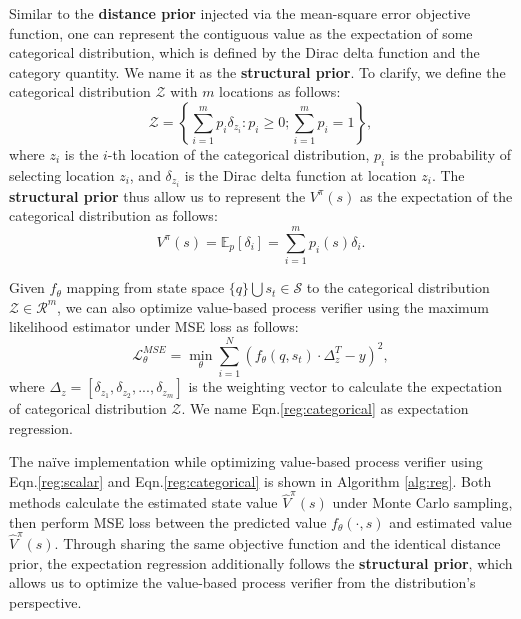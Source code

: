 Similar to the \textbf{distance prior} injected via the mean-square error objective function, one can represent the contiguous value as the expectation of some categorical distribution, which is defined by the Dirac delta function and the category quantity. We name it as the \textbf{structural prior}. To clarify, we define the categorical distribution $\mathcal{Z}$ with $m$ locations as follows:
\begin{equation}
    \mathcal{Z}=\left\{\sum_{i=1}^{m}p_i\delta_{z_i}:p_i\geq0;\sum_{i=1}^{m}p_i=1\right\},
\end{equation}
where $z_i$ is the $i$-th location of the categorical distribution,  $p_i$ is the probability of selecting location $z_i$, and $\delta_{z_i}$ is the Dirac delta function at location $z_i$. The \textbf{structural prior} thus allow us to represent the $V^\pi(s)$ as the expectation of the categorical distribution as follows:
\begin{equation}\label{value_cate}
    V^\pi(s)=\mathbb{E}_p[\delta_i]=\sum_{i=1}^{m}p_i(s)\delta_i.
\end{equation}

Given $f_\theta$ mapping from state space $\{q\}\bigcup s_t\in\mathcal{S}$ to the categorical distribution $\mathcal{Z}\in\mathcal{R}^{m}$, we can also optimize value-based process verifier using the maximum likelihood estimator under MSE loss as follows:
\begin{equation}\label{reg:categorical}
    \mathcal{L}_\theta^{MSE}=\min_\theta\sum_{i=1}^N(f_\theta(q,s_t)\cdot\Delta_z^T-y)^2,
\end{equation}
where $\Delta_z=[\delta_{z_1},\delta_{z_2},...,\delta_{z_{m}}]$ is the weighting vector to calculate the expectation of categorical distribution $\mathcal{Z}$. We name Eqn.\ref{reg:categorical} as expectation regression.


The na\"ive implementation while optimizing value-based process verifier using Eqn.\ref{reg:scalar} and Eqn.\ref{reg:categorical} is shown in Algorithm \ref{alg:reg}. Both methods calculate the estimated state value $\hat{V}^\pi(s)$ under Monte Carlo sampling, then perform MSE loss between the predicted value $f_\theta(\cdot,s)$ and estimated value $\hat{V}^\pi(s)$. Through sharing the same objective function and the identical distance prior, the expectation regression additionally follows the \textbf{structural prior}, which allows us to optimize the value-based process verifier from the distribution's perspective.

